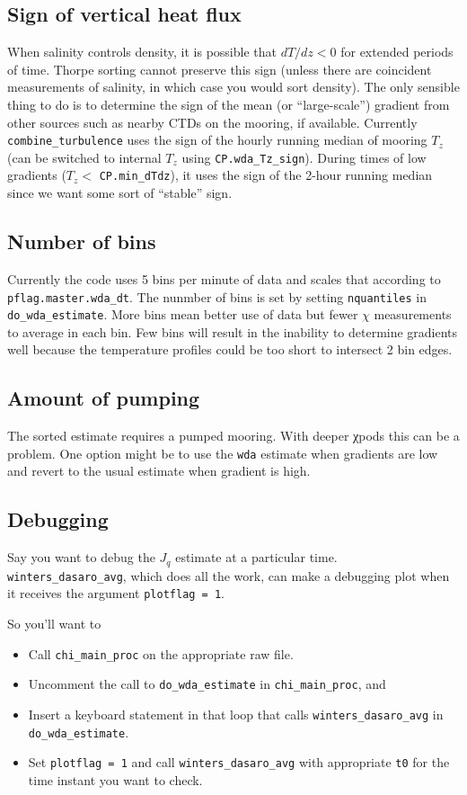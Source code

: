 \subsection{Sign of vertical heat flux}
When salinity controls density, it is possible that $dT/dz < 0$ for extended periods of time.
Thorpe sorting cannot preserve this sign (unless there are coincident measurements of salinity, in which case you would sort density).
The only sensible thing to do is to determine the sign of the mean (or ``large-scale'') gradient from other sources such as nearby CTDs on the mooring, if available.
Currently \texttt{combine\_turbulence} uses the sign of the hourly running median of mooring $T_z$ (can be switched to internal $T_z$ using \texttt{CP.wda\_Tz\_sign}).
During times of low gradients ($T_z < $ \texttt{CP.min\_dTdz}), it uses the sign of the 2-hour running median since we want some sort of ``stable'' sign.

\subsection{Number of bins}

Currently the code uses 5 bins per minute of data and scales that according to \texttt{pflag.master.wda\_dt}. The nunmber of bins is set by setting \texttt{nquantiles} in \texttt{do\_wda\_estimate}. More bins mean better use of data but fewer $χ$ measurements to average in each bin. Few bins will result in the inability to determine gradients well because the temperature profiles could be too short to intersect 2 bin edges.

\subsection{Amount of pumping}
The sorted estimate requires a pumped mooring. With deeper χpods this can be a problem. One option might be to use the \texttt{wda} estimate when gradients are low and revert to the usual estimate when gradient is high.

\subsection{Debugging}

Say you want to debug the $J_q$ estimate at a particular time.
\texttt{winters\_dasaro\_avg}, which does all the work, can make a debugging plot when it receives the argument \texttt{plotflag = 1}.

So you'll want to
\begin{itemize}
\item Call \texttt{chi\_main\_proc} on the appropriate raw file.
\item Uncomment the call to \texttt{do\_wda\_estimate} in \texttt{chi\_main\_proc}, and
\item Insert a keyboard statement in that loop that calls \texttt{winters\_dasaro\_avg} in \texttt{do\_wda\_estimate}.
\item Set \texttt{plotflag = 1} and call \texttt{winters\_dasaro\_avg} with appropriate \texttt{t0} for the time instant you want to check.
 \end{itemize}

